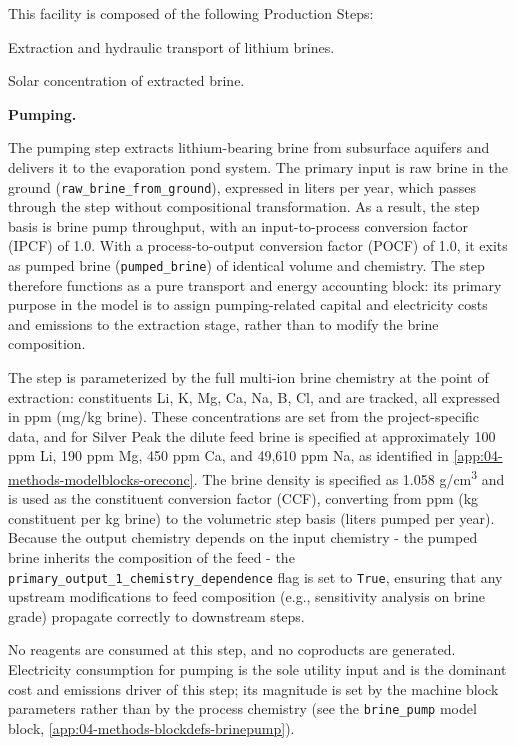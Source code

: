 This facility is composed of the following Production Steps:

\begin{description}[noitemsep, topsep=0pt]
    \item[\textbullet\enskip\texttt{Pumping:}] Extraction and hydraulic transport of lithium brines. 
    \item[\textbullet\enskip\texttt{Evaporation:}] Solar concentration of extracted brine.
\end{description}

\medskip
\noindent\textbf{Pumping.}\quad

The pumping step extracts lithium-bearing brine from subsurface aquifers and delivers it to the evaporation pond system. The primary input is raw brine in the ground (\texttt{raw\_brine\_from\_ground}), expressed in liters per year, which passes through the step without compositional transformation. As a result, the step basis is brine pump throughput, with an input-to-process conversion factor (IPCF) of 1.0. With a process-to-output conversion factor (POCF) of 1.0, it exits as pumped brine (\texttt{pumped\_brine}) of identical volume and chemistry. The step therefore functions as a pure transport and energy accounting block: its primary purpose in the model is to assign pumping-related capital and electricity costs and emissions to the extraction stage, rather than to modify the brine composition.

The step is parameterized by the full multi-ion brine chemistry at the point of extraction: constituents Li, K, Mg, Ca, Na, B, Cl, and  are tracked, all expressed in ppm (mg/kg brine). These concentrations are set from the project-specific data, and for Silver Peak the dilute feed brine is specified at approximately 100 ppm Li, 190 ppm Mg, 450 ppm Ca, and 49,610 ppm Na, as identified in \ref{app:04-methods-modelblocks-oreconc}. The brine density is specified as 1.058 g/cm\textsuperscript{3} and is used as the constituent conversion factor (CCF), converting from ppm (kg constituent per kg brine) to the volumetric step basis (liters pumped per year). Because the output chemistry depends on the input chemistry - the pumped brine inherits the composition of the feed - the \texttt{primary\_output\_1\_chemistry\_dependence} flag is set to \texttt{True}, ensuring that any upstream modifications to feed composition (e.g., sensitivity analysis on brine grade) propagate correctly to downstream steps.

No reagents are consumed at this step, and no coproducts are generated. Electricity consumption for pumping is the sole utility input and is the dominant cost and emissions driver of this step; its magnitude is set by the machine block parameters rather than by the process chemistry (see the \texttt{brine\_pump} model block, \ref{app:04-methods-blockdefs-brinepump}). 

